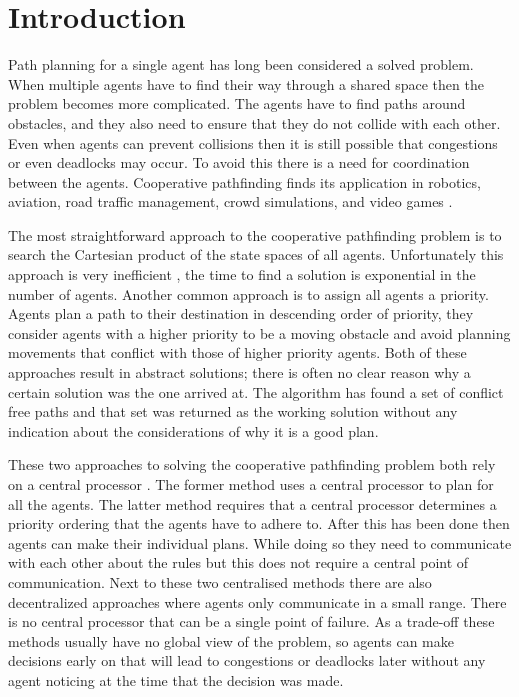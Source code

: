 \section{Introduction}\label{sec:intro}
Path planning for a single agent has long been considered a solved problem.
When multiple agents have to find their way through a shared space then the
problem becomes more complicated. The agents have to find paths around
obstacles, and they also need to ensure that they do not collide with each
other. Even when agents can prevent collisions then it is still possible that
congestions or even deadlocks may occur. To avoid this there is a need for
coordination between the agents. Cooperative pathfinding finds its application
in robotics, aviation, road traffic management, crowd simulations, and video
games \cite{standley2011}.

The most straightforward approach to the cooperative pathfinding problem is to
search the Cartesian product of the state spaces of all agents. Unfortunately
this approach is very inefficient \cite{sharon2013}, the time to find a
solution is exponential in the number of agents. Another common approach is to
assign all agents a priority. Agents plan a path to their destination in
descending order of priority, they consider agents with a higher priority to be
a moving obstacle and avoid planning movements that conflict with those of
higher priority agents. Both of these approaches result in abstract solutions;
there is often no clear reason why a certain solution
was the one arrived at. The algorithm has found a set of conflict free paths
and that set was returned as the working solution without any indication about
the considerations of why it is a good plan.

These two approaches to solving the cooperative pathfinding problem both rely
on a central processor \cite{chouhan2017}. The former method uses a central
processor to plan for
all the agents. The latter method requires that a central processor determines
a priority ordering that the agents have to adhere to. After this has been done
then agents can make their individual plans. While doing so they need to
communicate with each other about the rules but this does not require a central
point of communication. Next to these two centralised methods there are also
decentralized approaches where agents only communicate in a small range. There
is no central processor that can be a single point of failure. As a trade-off
these methods usually have no global view of the problem, so agents can make
decisions early on that will lead to congestions or deadlocks later without any
agent noticing at the time that the decision was made.

